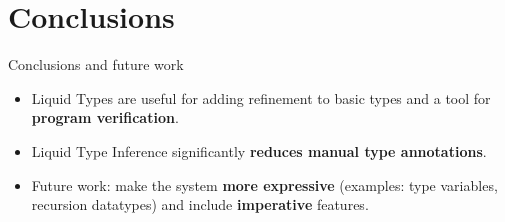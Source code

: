 \section{Conclusions}

\begin{frame}{Conclusions and future work}
    \begin{itemize}
        \item Liquid Types are useful for adding refinement to basic types and a tool for \textbf{program verification}.
        \item Liquid Type Inference significantly \textbf{reduces manual type annotations}.
        \item Future work: make the system \textbf{more expressive} (examples: type variables, recursion datatypes) and include \textbf{imperative} features.
    \end{itemize}
\end{frame}